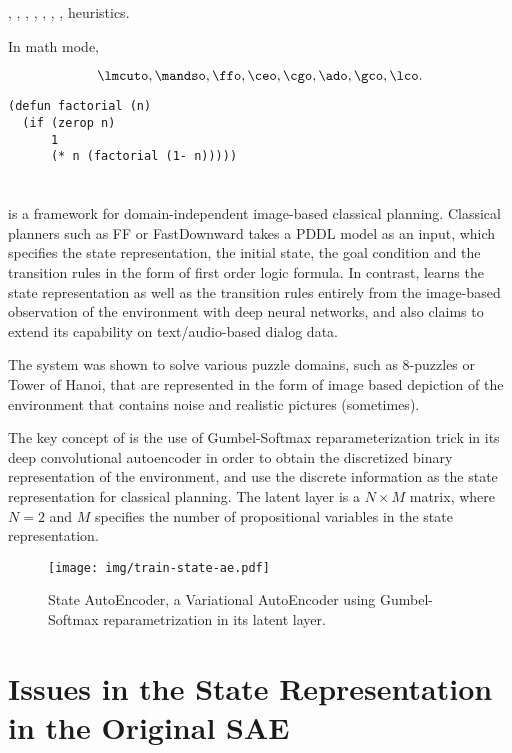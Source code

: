 \lmcuto, \mandso, \ffo, \ceo, \cgo, \ado, \gco, \lco heuristics.

In math mode,

\[
 \lmcuto, \mandso, \ffo, \ceo, \cgo, \ado, \gco, \lco.
\]

\begin{verbatim}
(defun factorial (n)
  (if (zerop n)
      1
      (* n (factorial (1- n)))))
\end{verbatim}

\section{\latentplanner}

\latentplanner \cite{Asai2018} is a framework for domain-independent image-based
classical planning.  Classical planners such as FF \cite{hoffmann01} or
FastDownward \cite{Helmert04} takes a PDDL model as an input, which
specifies the state representation, the initial state, the goal
condition and the transition rules in the form of first order logic
formula.  In contrast, \latentplanner learns the state representation as well as the transition rules
entirely from the image-based observation of the environment with deep neural networks, and also claims to
extend its capability on text/audio-based dialog data.

The system was shown to solve various puzzle domains, such as 8-puzzles or Tower of Hanoi,
that are represented in the form of image based depiction of the environment that contains noise
and realistic pictures (sometimes).

The key concept of \latentplanner is the use of Gumbel-Softmax
reparameterization trick in its deep convolutional autoencoder in order to obtain the
discretized binary representation of the environment, and use the
discrete information as the state representation for classical planning.
The latent layer is a $N\times M$ matrix, where $N=2$ and $M$ specifies
the number of propositional variables in the state representation.

\begin{figure}
 \texttt{[image: img/train-state-ae.pdf]}
 \caption{State AutoEncoder, a
 Variational AutoEncoder \cite{Kingma} using Gumbel-Softmax \cite{Jang} reparametrization in its
 latent layer.}
\end{figure}

\section{Issues in the State Representation in the Original SAE}

